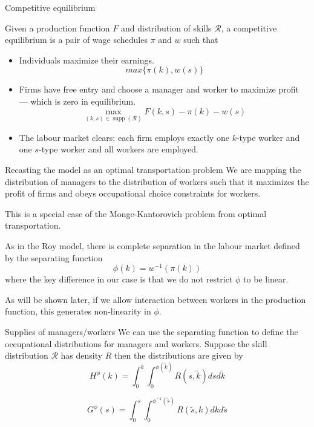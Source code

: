 \documentclass{beamer}
\DeclareMathOperator\supp{supp}
\begin{document}
		
	\begin{frame}{Competitive equilibrium}
		
		\begin{definition}
			Given a production function $F$ and distribution of skills $\mathcal{R}$, a competitive equilibrium is a pair of wage schedules $\pi$ and $w$ such that
			\smallskip
			\begin{itemize}
				\item Individuals maximize their earnings.
				 $$ max\{\pi(k),w(s)\} $$
				\item Firms have free entry and choose a manager and worker to maximize profit --- which is zero in equilibrium.
				$$ \max_{(k,s)\in\supp(\mathcal{R})} F(k,s) - \pi(k) - w(s) $$
				\item The labour market clears: each firm employs exactly one $k$-type worker and one $s$-type worker and all workers are employed. 
			\end{itemize}
		\end{definition}
		
	\end{frame}
	
	\begin{frame}{Recasting the model as an optimal transportation problem}
		We are mapping the distribution of managers to the distribution of workers such that it maximizes the profit of firms and obeys occupational choice constraints for workers.
		
		\bigskip
		
		This is a special case of the Monge-Kantorovich problem from optimal transportation.
		
		\bigskip
		
		As in the Roy model, there is complete separation in the labour market defined by the separating function 
		\begin{equation*}
			\phi(k) = w^{-1}(\pi(k))
		\end{equation*}
		where the key difference in our case is that we do not restrict $\phi$ to be linear.
		
		\bigskip
		
		 As will be shown later, if we allow interaction between workers in the production function, this generates non-linearity in $\phi$.
	\end{frame}
	
	
	\begin{frame}{Supplies of managers/workers}
		We can use the separating function to define the occupational distributions for managers and workers. Suppose the skill distribution $\mathcal{R}$ has density $R$ then the distributions are given by 
		\begin{equation*}
			H^\phi(k) = \int_0^k\int_0^{\phi(\tilde{k})} R(s,\tilde{k})dsd\tilde{k}
		\end{equation*}
		
		\begin{equation*}
			G^\phi(s) = \int_0^s\int_0^{\phi^{-1}(\tilde{s})} R(\tilde{s},k)dkd\tilde{s}
		\end{equation*}
	\end{frame}
	
	
	
\end{document}
